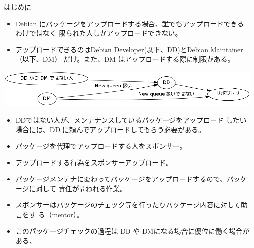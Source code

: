 
\begin{frame}{はじめに}

\begin{itemize}
\item Debian にパッケージをアップロードする場合、誰でもアップロードできるわけではなく
限られた人しかアップロードできない。

\item アップロードできるのはDebian Developer(以下、DD)とDebian Maintainer（以下、DM）
だけ。また、DM はアップロードする際に制限がある。

\end{itemize}


 \begin{center}
  \includegraphics[width=1.0\hsize]{image201108/sponsor0.png}
 \end{center}


\end{frame}

\begin{frame}

\begin{itemize}[<+->]
\item DDではない人が、メンテナンスしているパッケージをアップロード
したい場合には、DD に頼んでアップロードしてもらう必要がある。

\item パッケージを代理でアップロードする人をスポンサー。
\item アップロードする行為をスポンサーアップロード。

\item パッケージメンテナに変わってパッケージをアップロードするので、パッケージに対して
責任が問われる作業。
\item スポンサーはパッケージのチェック等を行ったりパッケージ内容に対して助言をす
る（mentor）。 
\item このパッケージチェックの過程は DD や DMになる場合に優位に働く場合がある、
\end{itemize}

\end{frame}


